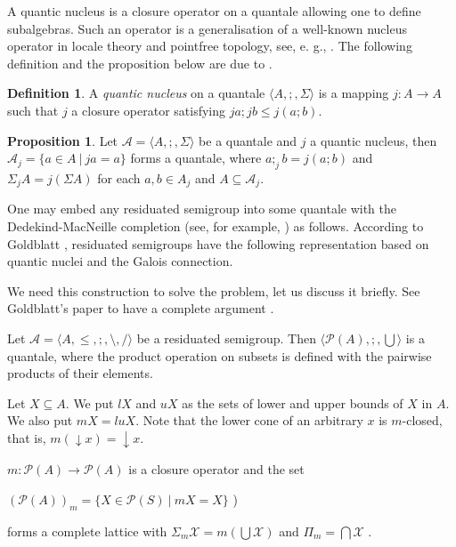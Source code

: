 \documentclass[a4paper]{article}
\theoremstyle{definition}
\newtheorem{definition}{Definition}
\theoremstyle{theorem}
\theoremstyle{proposition}
\newtheorem{proposition}{Proposition}
\theoremstyle{lemma}
\theoremstyle{ex}
\theoremstyle{corollary}
\theoremstyle{claim}
\begin{document}
A quantic nucleus is a closure operator on a quantale allowing one to define subalgebras. Such an operator is a generalisation of a well-known nucleus operator in locale theory and pointfree topology, see, e. g., \cite{bezhanishvili2016locales}. The following definition and the proposition below are due to \cite[Theorem 3.1.1]{rosenthal1990quantales}.
\begin{definition}
  A \emph{quantic nucleus} on a quantale $\langle A, ;, \Sigma \rangle$ is a mapping $j : A \to A$ such that $j$ a closure operator satisfying $j a ; j b \leq j (a ; b)$.
\end{definition}

\begin{proposition} \label{subsemi}
  Let $\mathcal{A} = \langle A, ;, \Sigma \rangle$ be a quantale and $j$ a quantic nucleus, then
  $\mathcal{A}_j = \{ a \in A \: | \: j a = a \}$ forms a quantale, where $a ;_j b = j(a ; b)$ and $\Sigma_j A = j (\Sigma A)$ for each $a, b \in {A}_j$ and $A \subseteq \mathcal{A}_j$.
\end{proposition}

One may embed any residuated semigroup into some quantale with the Dedekind-MacNeille completion (see, for example, \cite{theunissen2007macneille}) as follows. According to Goldblatt \cite{goldblatt2006kripke}, residuated semigroups have the following representation based on quantic nuclei and the Galois connection.

We need this construction to solve the problem, let us discuss it briefly. See Goldblatt's paper to have a complete argument \cite{goldblatt2006kripke}.

Let $\mathcal{A} = \langle A, \leq, ;, \setminus, / \rangle$ be a residuated semigroup. Then $\langle \mathcal{P}(A), ;, \bigcup \rangle$ is a quantale, where the product operation on subsets is defined with the pairwise products of their elements.

Let $X \subseteq A$. We put $lX$ and $uX$ as the sets of lower and upper bounds of $X$ in $A$. We also put $m X = lu X$.
Note that the lower cone of an arbitrary $x$ is $m$-closed, that is,
$m (\downarrow x) = \downarrow x$.

$m : \mathcal{P}(A) \to \mathcal{P}(A)$ is a closure operator and the set

\begin{center}
$(\mathcal{P}(A))_m = \{ X \in \mathcal{P}(S) \: | \: m X = X\}$ )
\end{center}
forms a complete lattice with $\Sigma_{m} \mathcal{X} = m ( \bigcup \mathcal{X})$ and $\Pi_{m} = \bigcap \mathcal{X}$ \cite{davey2002introduction}.
\end{document}
